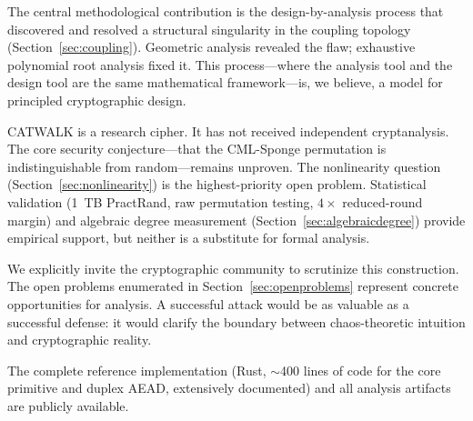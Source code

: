\documentclass[runningheads]{llncs}
\begin{document}
The central methodological contribution is the design-by-analysis process
that discovered and resolved a structural singularity in the coupling topology
(Section~\ref{sec:coupling}).  Geometric analysis revealed the flaw;
exhaustive polynomial root analysis fixed it.  This process---where the
analysis tool and the design tool are the same mathematical framework---is,
we believe, a model for principled cryptographic design.

CATWALK is a research cipher.  It has not received independent cryptanalysis.
The core security conjecture---that the CML-Sponge permutation is
indistinguishable from random---remains unproven.  The nonlinearity question
(Section~\ref{sec:nonlinearity}) is the highest-priority open problem.
Statistical validation (1~TB PractRand, raw permutation testing, $4\times$
reduced-round margin) and algebraic degree measurement (Section~\ref{sec:algebraicdegree})
provide empirical support, but neither is a substitute for formal analysis.

We explicitly invite the cryptographic community to scrutinize this
construction.  The open problems enumerated in Section~\ref{sec:openproblems}
represent concrete opportunities for analysis.  A successful attack would be
as valuable as a successful defense: it would clarify the boundary between
chaos-theoretic intuition and cryptographic reality.

The complete reference implementation (Rust, $\sim$400 lines of code for the
core primitive and duplex AEAD, extensively documented) and all analysis
artifacts are publicly available.



\end{document}
